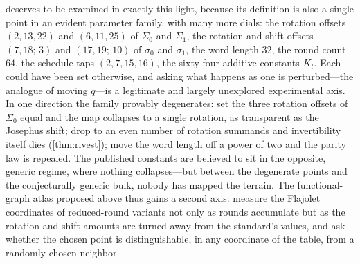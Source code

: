 \SHA{} deserves to be examined in exactly this light, because its
definition is also a single point in an evident parameter family, with
many more dials: the rotation offsets $(2,13,22)$ and $(6,11,25)$ of
$\Sigma_0$ and $\Sigma_1$, the rotation-and-shift offsets $(7,18;\,3)$
and $(17,19;\,10)$ of $\sigma_0$ and $\sigma_1$, the word length $32$,
the round count $64$, the schedule taps $(2,7,15,16)$, the sixty-four
additive constants $K_t$. Each could have been set otherwise, and asking
what happens as one is perturbed---the analogue of moving $q$---is a
legitimate and largely unexplored experimental axis. In one direction
the family provably degenerates: set the three rotation offsets of
$\Sigma_0$ equal and the map collapses to a single rotation, as
transparent as the Josephus shift; drop to an even number of rotation
summands and invertibility itself dies (\cref{thm:rivest}); move the
word length off a power of two and the parity law is repealed. The
published constants are believed to sit in the opposite, generic regime,
where nothing collapses---but between the degenerate points and the
conjecturally generic bulk, nobody has mapped the terrain. The
functional-graph atlas proposed above thus gains a second axis: measure
the Flajolet coordinates of reduced-round variants not only as rounds
accumulate but as the rotation and shift amounts are turned away from
the standard's values, and ask whether the chosen point is
distinguishable, in any coordinate of the table, from a randomly chosen
neighbor.
